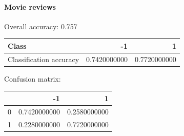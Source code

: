 \paragraph{Movie reviews \\}
Overall accuracy: 0.757

\begin{tabular}{l|r|r}
Class & -1 & 1 \\
\hline
Classification accuracy & 0.7420000000 & 0.7720000000 \\
\end{tabular}

Confusion matrix:

\begin{tabular}{l|r|r}
& -1 & 1 \\
\hline
0 & 0.7420000000 & 0.2580000000 \\
1 & 0.2280000000 & 0.7720000000 \\
\end{tabular}

